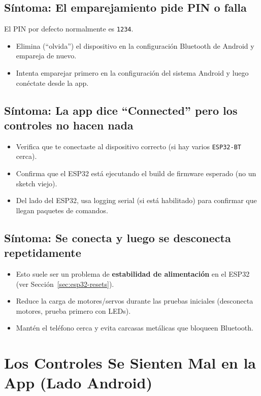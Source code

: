 \subsection*{Síntoma: El emparejamiento pide PIN o falla}
El PIN por defecto normalmente es \texttt{1234}.
\begin{itemize}
    \item Elimina (``olvida'') el dispositivo en la configuración Bluetooth de Android y empareja de nuevo.
    \item Intenta emparejar primero en la configuración del sistema Android y luego conéctate desde la app.
\end{itemize}

\subsection*{Síntoma: La app dice ``Connected'' pero los controles no hacen nada}
\begin{itemize}
    \item Verifica que te conectaste al dispositivo correcto (si hay varios \texttt{ESP32-BT} cerca).
    \item Confirma que el ESP32 está ejecutando el build de firmware esperado (no un sketch viejo).
    \item Del lado del ESP32, usa logging serial (si está habilitado) para confirmar que llegan paquetes de comandos.
\end{itemize}

\subsection*{Síntoma: Se conecta y luego se desconecta repetidamente}
\begin{itemize}
    \item Esto suele ser un problema de \textbf{estabilidad de alimentación} en el ESP32 (ver Sección~\ref{sec:esp32-resets}).
    \item Reduce la carga de motores/servos durante las pruebas iniciales (desconecta motores, prueba primero con LEDs).
    \item Mantén el teléfono cerca y evita carcasas metálicas que bloqueen Bluetooth.
\end{itemize}

\section{Los Controles Se Sienten Mal en la App (Lado Android)}
\label{sec:android-controls}


